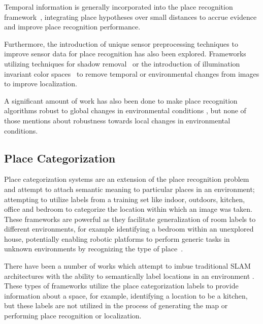 \documentclass[letterpaper, 10 pt, conference]{ieeeconf}  %
\begin{document}
Temporal information is generally incorporated into the place recognition framework~\cite{Milford2012}, integrating place hypotheses over small distances to accrue evidence and improve place recognition performance.

Furthermore, the introduction of unique sensor preprocessing techniques to improve sensor data for place recognition has also been explored. Frameworks utilizing techniques for shadow removal~\cite{corke2013dealing} or the introduction of illumination invariant color spaces~\cite{mcmanus2014shady} to remove temporal or environmental changes from images to improve localization. 

A significant amount of work has also been done to make place recognition algorithms robust to global changes in environmental conditions \cite{Maddern,McManus2015}, but none of those mentions about robustness towards local changes in environmental conditions.


\subsection{Place Categorization}

Place categorization systems are an extension of the place recognition problem and attempt to attach semantic meaning to particular places in an environment; attempting to utilize labels from a training set like indoor, outdoors, kitchen, office and bedroom to categorize the location within which an image was taken. These frameworks are powerful as they facilitate generalization of room labels to different environments, for example identifying a bedroom within an unexplored house, potentially enabling robotic platforms to perform generic tasks in unknown environments by recognizing the type of place~\cite{wu2009visual}. 

There have been a number of works which attempt to imbue traditional SLAM architectures with the ability to semantically label locations in an environment \cite{sunderhauf2016place}. These types of frameworks utilize the place categorization labels to provide information about a space, for example, identifying a location to be a kitchen, but these labels are not utilized in the process of generating the map or performing place recognition or localization. 
\end{document}
